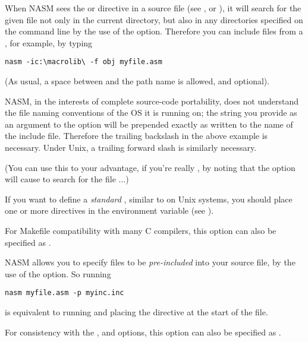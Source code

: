 When NASM sees the  or  directive
in a source file (see ,  or
), it will search for the given file not only in the
current directory, but also in any directories specified on the command
line by the use of the  option. Therefore you can include files
from a , for example, by typing

\begin{lstlisting}
nasm -ic:\macrolib\ -f obj myfile.asm
\end{lstlisting}

(As usual, a space between  and the path name is allowed, and
optional).

NASM, in the interests of complete source-code portability, does not
understand the file naming conventions of the OS it is running on;
the string you provide as an argument to the  option will be
prepended exactly as written to the name of the include file.
Therefore the trailing backslash in the above example is necessary.
Under Unix, a trailing forward slash is similarly necessary.

(You can use this to your advantage, if you're really ,
by noting that the option  will cause 
to search for the file ...)

If you want to define a \emph{standard} ,
similar to  on Unix systems, you should place one or
more  directives in the  environment variable (see
).

For Makefile compatibility with many C compilers, this option can also
be specified as .


NASM allows you to specify files to be \emph{pre-included} into
your source file, by the use of the  option. So running

\begin{lstlisting}
nasm myfile.asm -p myinc.inc
\end{lstlisting}

is equivalent to running  and placing the
directive  at the start of the file.

For consistency with the ,  and  options,
this option can also be specified as .

